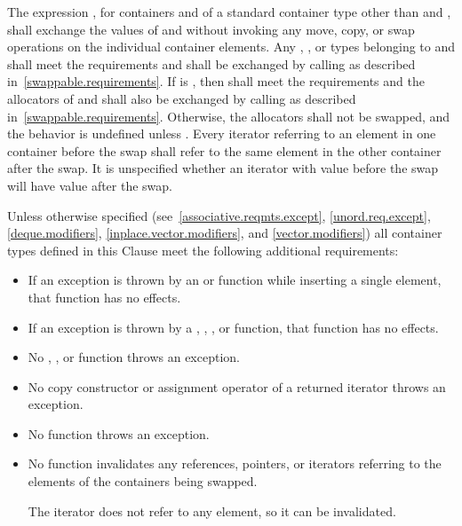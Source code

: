 \pnum
The expression , for containers  and  of a standard
container type other than  and ,
shall exchange the values of  and
 without invoking any move, copy, or swap operations on the individual
container elements.
Any , , or  types
belonging to  and  shall meet the  requirements
and shall be exchanged by calling 
as described in~\ref{swappable.requirements}. If
 is
, then
 shall meet the  requirements and
the allocators of  and  shall also be exchanged
by calling  as described in~\ref{swappable.requirements}.
Otherwise, the allocators shall not be swapped, and the behavior is
undefined unless . Every iterator
referring to an element in one container before the swap shall refer to the same
element in the other container after the swap. It is unspecified whether an iterator
with value  before the swap will have value  after the
swap.

\pnum
Unless otherwise specified (see~\ref{associative.reqmts.except}, \ref{unord.req.except}, \ref{deque.modifiers}, \ref{inplace.vector.modifiers}, and
\ref{vector.modifiers})
all container types defined in this Clause meet
the following additional requirements:

\begin{itemize}
\item
If an exception is thrown by an
 or 
function while inserting a single element, that
function has no effects.
\item
If an exception is thrown by a
,
,
, or 
function, that function has no effects.
\item
No
,
,
or
function throws an exception.
\item
No copy constructor or assignment operator of a returned iterator
throws an exception.
\item
No
function throws an exception.
\item
No
function invalidates any references,
pointers, or iterators referring to the elements
of the containers being swapped.
\begin{note}
The  iterator does not refer to any element, so it can be invalidated.
\end{note}
\end{itemize}

